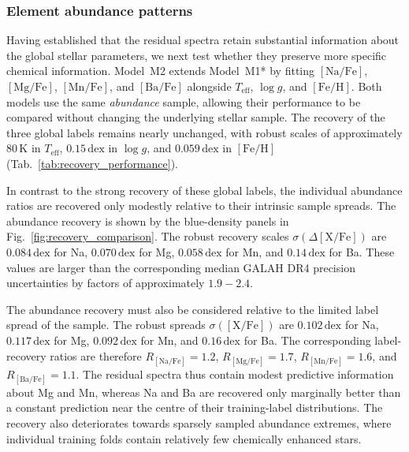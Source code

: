 \documentclass[twocolumn,apj,numberedappendix,appendixfloats]{openjournal}
\begin{document}
\subsubsection{Element abundance patterns}
\label{sec:analysis_cannon_fitted_abundances}

Having established that the residual spectra retain substantial information about the global stellar parameters, we next test whether they preserve more specific chemical information. Model~\textcolor{M2}{M2} extends Model~\textcolor{M1}{M1*} by fitting $[\mathrm{Na/Fe}]$, $[\mathrm{Mg/Fe}]$, $[\mathrm{Mn/Fe}]$, and $[\mathrm{Ba/Fe}]$ alongside $T_\mathrm{eff}$, $\log g$, and $[\mathrm{Fe/H}]$. Both models use the same \textit{abundance} sample, allowing their performance to be compared without changing the underlying stellar sample. The recovery of the three global labels remains nearly unchanged, with robust scales of approximately $80\,\mathrm{K}$ in $T_\mathrm{eff}$, $0.15\,\mathrm{dex}$ in $\log g$, and $0.059\,\mathrm{dex}$ in $[\mathrm{Fe/H}]$ (Tab.~\ref{tab:recovery_performance}).

In contrast to the strong recovery of these global labels, the individual abundance ratios are recovered only modestly relative to their intrinsic sample spreads. The abundance recovery is shown by the blue-density panels in Fig.~\ref{fig:recovery_comparison}. The robust recovery scales $\sigma(\Delta[\mathrm{X/Fe}])$ are $0.084\,\mathrm{dex}$ for Na, $0.070\,\mathrm{dex}$ for Mg, $0.058\,\mathrm{dex}$ for Mn, and $0.14\,\mathrm{dex}$ for Ba. These values are larger than the corresponding median GALAH DR4 precision uncertainties by factors of approximately $1.9-2.4$.

The abundance recovery must also be considered relative to the limited label spread of the sample. The robust spreads $\sigma(\mathrm{[X/Fe]})$ are $0.102\,\mathrm{dex}$ for Na, $0.117\,\mathrm{dex}$ for Mg, $0.092\,\mathrm{dex}$ for Mn, and $0.16\,\mathrm{dex}$ for Ba. The corresponding label-recovery ratios are therefore $R_{[\mathrm{Na/Fe}]}=1.2$, $R_{[\mathrm{Mg/Fe}]}=1.7$, $R_{[\mathrm{Mn/Fe}]}=1.6$, and $R_{[\mathrm{Ba/Fe}]}=1.1$. The residual spectra thus contain modest predictive information about Mg and Mn, whereas Na and Ba are recovered only marginally better than a constant prediction near the centre of their training-label distributions. The recovery also deteriorates towards sparsely sampled abundance extremes, where individual training folds contain relatively few chemically enhanced stars.
\end{document}
